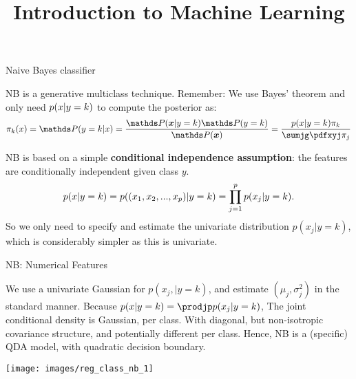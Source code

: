 \documentclass[11pt,compress,t,notes=noshow, xcolor=table]{beamer}
\title{Introduction to Machine Learning}
\institute{\href{https://compstat-lmu.github.io/lecture_i2ml/}{compstat-lmu.github.io/lecture\_i2ml}}
\date{}
\newenvironment{knitrout}{}{} %
\begin{document}














\framebreak

\begin{vbframe}{Naive Bayes classifier}

NB is a generative multiclass technique. Remember: We use Bayes' theorem and only need $p(x | y=k)$ to compute the posterior as:
$$\pikx = \postk = \frac{\P(\xv | y = k) \P(y = k)}{\P(\xv)} = \frac{\pdfxyk \pik}{\sumjg \pdfxyj \pi_j} $$


NB is based on a simple \textbf{conditional independence assumption}: the features are conditionally independent given class $y$.
$$
p(x | y=k) = p((x_1, x_2, ..., x_p)|y = k)=\prod_{j=1}^p p(x_j|y = k).
$$
So we only need to specify and estimate the univariate distribution $p(x_j|y = k)$, which is considerably simpler as this is univariate.

\end{vbframe}


\begin{vbframe}{NB: Numerical Features}

We use a univariate Gaussian for $p(x_j, | y=k)$, and estimate $(\mu_j, \sigma^2_j)$ in the standard manner. Because $\pdfxyk = \prodjp p(x_j|y = k)$, The joint conditional density is Gaussian, per class. With diagonal, but non-isotropic covariance structure, and potentially different per class. Hence, NB is a (specific) QDA model, with quadratic decision boundary.

\begin{knitrout}\scriptsize
{}\color{fgcolor}

{\centering \texttt{[image: images/reg\_class\_nb\_1]} 

}



\end{knitrout}
\end{vbframe}
\end{document}
